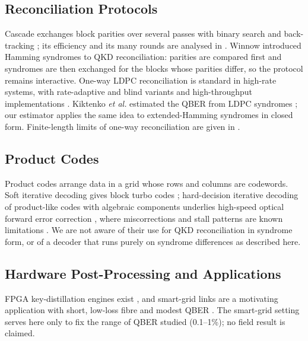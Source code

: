 \documentclass[conference]{IEEEtran}
\begin{document}
\subsection{Reconciliation Protocols}
Cascade exchanges block parities over several passes with binary search and back-tracking \cite{cascade}; its efficiency and its many rounds are analysed in \cite{demystifying}. Winnow \cite{winnow} introduced Hamming syndromes to QKD reconciliation: parities are compared first and syndromes are then exchanged for the blocks whose parities differ, so the protocol remains interactive. One-way LDPC reconciliation \cite{elkouss2009,elkouss2011} is standard in high-rate systems, with rate-adaptive and blind variants \cite{blind2012,kiktenko2017} and high-throughput implementations \cite{dixon2014,mao2019}. Kiktenko \textit{et al.} estimated the QBER from LDPC syndromes \cite{kiktenko2018}; our estimator applies the same idea to extended-Hamming syndromes in closed form. Finite-length limits of one-way reconciliation are given in \cite{tomamichel2017}.

\subsection{Product Codes}
Product codes \cite{elias1954} arrange data in a grid whose rows and columns are codewords. Soft iterative decoding gives block turbo codes \cite{pyndiah1998}; hard-decision iterative decoding of product-like codes with algebraic components underlies high-speed optical forward error correction \cite{justesen2011,smith2012}, where miscorrections and stall patterns are known limitations \cite{hager2018}. We are not aware of their use for QKD reconciliation in syndrome form, or of a decoder that runs purely on syndrome differences as described here.

\subsection{Hardware Post-Processing and Applications}
FPGA key-distillation engines exist \cite{constantin2017}, and smart-grid links are a motivating application with short, low-loss fibre and modest QBER \cite{alshowkan2022}. The smart-grid setting serves here only to fix the range of QBER studied (0.1--1\%); no field result is claimed.
\end{document}
